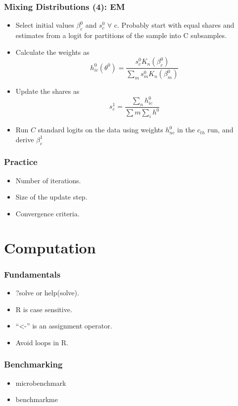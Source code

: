\documentclass{beamer}
\newcommand{\1}{\mathbb{1}}
\begin{document}
\begin{frame}\frametitle{Mixing Distributions (4): EM}
\begin{itemize}
 \item Select initial values $\beta_c^0$ and $s_c^0$ $\forall$ c. Probably start with equal shares and estimates from a logit for partitions of the sample into C subsamples. 
 \item Calculate the weights as 
 \begin{equation}
  h^0_{ic}(\theta^0) = \dfrac{s^{0}_{c} K_n(\beta_c^0)}{\sum_{m} s^0_m K_n(\beta_{m}^0)} 
 \end{equation}
 \item Update the shares as
 \begin{equation}
  s^1_c = \dfrac{\sum_n h^0_{ic}}{\sum m \sum_i h^0_{}}
 \end{equation}
\item Run $C$ standard logits on the data using weights $h^0_{nc}$ in the $c_{th}$ run, and derive $\beta^1_c$
\end{itemize}
\end{frame}

\begin{frame}\frametitle{Practice}
\begin{itemize}
\item Number of iterations.
\item Size of the update step.
\item Convergence criteria. 
\end{itemize}
\end{frame}

\section{Computation}


\begin{frame}\frametitle{Fundamentals}
\begin{itemize}
 \item ?solve or help(solve). 
 \item R is case sensitive. 
 \item ``<-'' is an assignment operator. 
 \item Avoid loops in R. 
\end{itemize}
\end{frame}

\begin{frame}\frametitle{Benchmarking}
\begin{itemize}
 \item microbenchmark
 \item benchmarkme
\end{itemize}
\end{frame}
\end{document}
